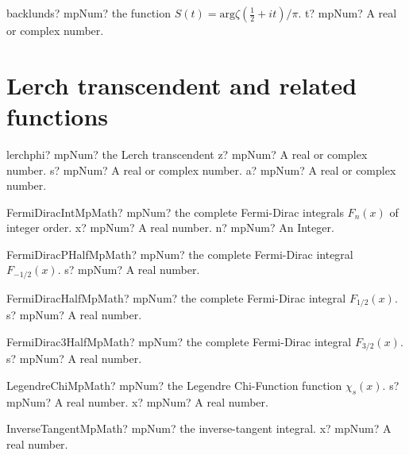 \documentclass[12pt,a4paper,openany]{book}
\begin{document}
\begin{mpFunctionsExtract}
\mpFunctionOne
{backlunds? mpNum? the function $S(t) = \text{arg}\zeta\left(\tfrac{1}{2}+it\right)/\pi$.}
{t? mpNum? A real or complex number.}
\end{mpFunctionsExtract}

\section{Lerch transcendent and related functions}

\begin{mpFunctionsExtract}
\mpFunctionThree
{lerchphi? mpNum? the Lerch transcendent}
{z? mpNum? A real or complex number.}
{s? mpNum? A real or complex number.}
{a? mpNum? A real or complex number.}
\end{mpFunctionsExtract}

\begin{mpFunctionsExtract}
\mpFunctionTwoNotImplemented
{FermiDiracIntMpMath? mpNum? the complete Fermi-Dirac integrals $F_n(x)$ of integer order.}
{x? mpNum? A real number.}
{n? mpNum? An Integer.}
\end{mpFunctionsExtract}

\begin{mpFunctionsExtract}
\mpFunctionOneNotImplemented
{FermiDiracPHalfMpMath? mpNum? the complete Fermi-Dirac integral $F_{-1/2}(x)$.}
{s? mpNum? A real number.}
\end{mpFunctionsExtract}

\begin{mpFunctionsExtract}
\mpFunctionOneNotImplemented
{FermiDiracHalfMpMath? mpNum? the complete Fermi-Dirac integral $F_{1/2}(x)$.}
{s? mpNum? A real number.}
\end{mpFunctionsExtract}

\begin{mpFunctionsExtract}
\mpFunctionOneNotImplemented
{FermiDirac3HalfMpMath? mpNum? the complete Fermi-Dirac integral $F_{3/2}(x)$.}
{s? mpNum? A real number.}
\end{mpFunctionsExtract}

\begin{mpFunctionsExtract}
\mpFunctionTwoNotImplemented
{LegendreChiMpMath? mpNum? the Legendre Chi-Function function $\chi_s(x)$.}
{s? mpNum? A real number.}
{x? mpNum? A real number.}
\end{mpFunctionsExtract}

\begin{mpFunctionsExtract}
\mpFunctionOneNotImplemented
{InverseTangentMpMath? mpNum? the inverse-tangent integral.}
{x? mpNum? A real number.}
\end{mpFunctionsExtract}
\end{document}

